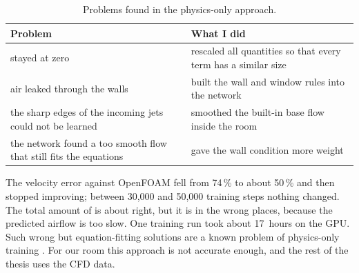 \begin{table}[h]
  \centering
  \caption{Problems found in the physics-only approach.}
  \label{tab:pinnfix}
  \begin{tabular}{>{\raggedright}p{6.5cm}p{7.2cm}}
    \toprule
    Problem & What I did\\
    \midrule
    \cotwo{} stayed at zero & rescaled all quantities so that every term has a similar size\\
    air leaked through the walls & built the wall and window rules into the network\\
    the sharp edges of the incoming jets could not be learned & smoothed the built-in base flow inside the room\\
    the network found a too smooth flow that still fits the equations & gave the wall condition more weight\\
    \bottomrule
  \end{tabular}
\end{table}

The velocity error against OpenFOAM fell from 74\,\% to about 50\,\% and then stopped improving; between 30,000
and 50,000 training steps nothing changed. The total amount of \cotwo{} is about right, but it is in the wrong
places, because the predicted airflow is too slow. One training run took about 17~hours on the GPU. Such wrong but
equation-fitting solutions are a known problem of physics-only training . For our room this
approach is not accurate enough, and the rest of the thesis uses the CFD data.
